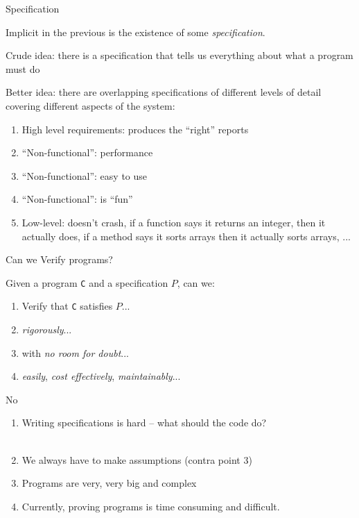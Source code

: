 \documentclass[xetex,aspectratio=169,14pt,hyperref={pdfpagelabels=true,pdflang={en-GB}}]{beamer}
\begin{document}
\begin{frame}
  {Specification}

  Implicit in the previous is the existence of some
  \emph{specification}.

  \bigskip

  Crude idea: there is a specification that tells us everything about what a program must do

  Better idea: there are overlapping specifications of different levels of detail covering different aspects of the system:
  \begin{enumerate}
  \item High level requirements: produces the ``right'' reports
  \item ``Non-functional'': performance
  \item ``Non-functional'': easy to use
  \item ``Non-functional'': is ``fun''
  \item Low-level: doesn't crash, if a function says it returns an
    integer, then it actually does, if a method says it sorts arrays
    then it actually sorts arrays, ...
  \end{enumerate}
\end{frame}

\begin{frame}
  {Can we Verify programs?}

  Given a program \texttt{C} and a specification $P$, can we:
  \begin{enumerate}
  \item Verify that \texttt{C} satisfies $P$...
  \item \emph{rigorously}...
  \item with \emph{no room for doubt}...
  \item \emph{easily}, \emph{cost effectively}, \emph{maintainably}...
  \end{enumerate}
\end{frame}

\begin{frame}
  {No}

  \begin{enumerate}
  \item Writing specifications is hard -- what should the code do? \\
    \\
  \item We always have to make assumptions (contra point 3) \\
  \item Programs are very, very big and complex \\
  \item Currently, proving programs is time consuming and difficult.
  \end{enumerate}
\end{frame}
\end{document}
